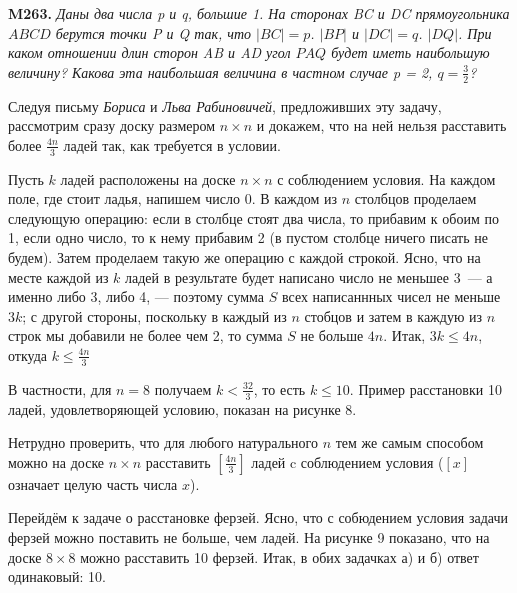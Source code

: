 \begin{minipage}{.3\textwidth}
    \vspace{2cm}
    \textbf{M263.}
    \textit{Даны два числа p и q, большие 1. На сторонах BC и DC прямоугольника $ABCD$ берутся точки P и Q так, что $|BC| = p$. $|BP|$ и $|DC| = q$. $|DQ|$. При каком отношении длин сторон AB и AD угол $PAQ$ будет иметь наибольшую величину? Какова эта наибольшая величина в частном случае p = 2, $q = \frac{3}{2}$?}
\end{minipage}
\hspace{0.5cm}
\begin{minipage}{.6\textwidth}
   \hspace{0.5cm}Следуя письму \textit{Бориса} и \textit{Льва Рабиновичей}, предложивших эту задачу, рассмотрим сразу доску размером $n\times n$ и докажем, что на ней нельзя расставить более $\frac{4n}{3}$ ладей так, как требуется в условии.
    
    \hspace{0.5cm}Пусть $k$ ладей расположены на доске  $n\times n$ с соблюдением условия. На каждом поле, где стоит ладья, напишем число 0. В каждом из $n$ столбцов проделаем следующую операцию: если в столбце стоят два числа, то прибавим к обоим по 1, если одно число, то к нему прибавим 2 (в пустом столбце ничего писать не будем). Затем проделаем такую же операцию с каждой строкой. Ясно, что на месте каждой из $k$ ладей в результате будет написано число не меньшее 3~--- а именно либо 3, либо 4, --- поэтому сумма $S$ всех написаннных чисел не меньше $3k$; с другой стороны, поскольку в каждый из $n$ стобцов и затем в каждую из $n$ строк мы добавили не более чем 2, то сумма $S$ не больше $4n$. Итак, $3k\le4n$, откуда $k\le\frac{4n}{3}$

    \hspace{0.5cm}В частности, для $n=8$ получаем $k<\frac{32}{3}$, то есть $k\leq10$. Пример расстановки 10 ладей, удовлетворяющей условию, показан на рисунке 8.

    \hspace{0.5cm}Нетрудно проверить, что для любого натурального $n$ тем же самым способом можно на доске $n\times n$ расставить $[\frac{4n}{3}]$ ладей c соблюдением условия ($[x]$ означает целую часть числа $x$). 
    
    \hspace{0.5cm}Перейдём к задаче о расстановке ферзей. Ясно, что с собюдением условия задачи ферзей можно поставить не больше, чем ладей. На рисунке 9 показано, что на доске $8\times 8$ можно расставить 10 ферзей. Итак, в обих задачках а) и б) ответ одинаковый: 10.


\end{minipage}
